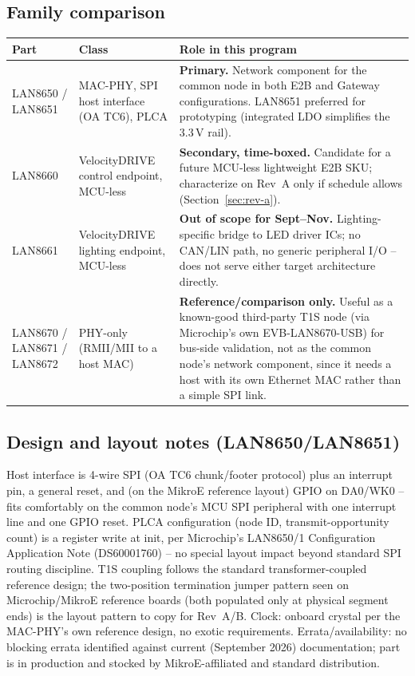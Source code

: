 \subsection{Family comparison}

\begin{center}
\small
\begin{tabularx}{\linewidth}{@{}p{2.4cm} p{2.6cm} X@{}}
\toprule
\textbf{Part} & \textbf{Class} & \textbf{Role in this program} \\
\midrule
LAN8650 / LAN8651 & MAC-PHY, SPI host interface (OA TC6), PLCA & \textbf{Primary.} Network component for the common node in both E2B and Gateway configurations. LAN8651 preferred for prototyping (integrated LDO simplifies the 3.3\,V rail). \\
LAN8660 & VelocityDRIVE control endpoint, MCU-less & \textbf{Secondary, time-boxed.} Candidate for a future MCU-less lightweight E2B SKU; characterize on Rev~A only if schedule allows (Section~\ref{sec:rev-a}). \\
LAN8661 & VelocityDRIVE lighting endpoint, MCU-less & \textbf{Out of scope for Sept--Nov.} Lighting-specific bridge to LED driver ICs; no CAN/LIN path, no generic peripheral I/O -- does not serve either target architecture directly. \\
LAN8670 / LAN8671 / LAN8672 & PHY-only (RMII/MII to a host MAC) & \textbf{Reference/comparison only.} Useful as a known-good third-party T1S node (via Microchip's own EVB-LAN8670-USB) for bus-side validation, not as the common node's network component, since it needs a host with its own Ethernet MAC rather than a simple SPI link. \\
\bottomrule
\end{tabularx}
\end{center}

\subsection{Design and layout notes (LAN8650/LAN8651)}

Host interface is 4-wire SPI (OA TC6 chunk/footer protocol) plus an interrupt pin, a general reset, and (on the MikroE reference layout) GPIO on DA0/WK0 -- fits comfortably on the common node's MCU SPI peripheral with one interrupt line and one GPIO reset. PLCA configuration (node ID, transmit-opportunity count) is a register write at init, per Microchip's LAN8650/1 Configuration Application Note (DS60001760) -- no special layout impact beyond standard SPI routing discipline. T1S coupling follows the standard transformer-coupled reference design; the two-position termination jumper pattern seen on Microchip/MikroE reference boards (both populated only at physical segment ends) is the layout pattern to copy for Rev~A/B. Clock: onboard crystal per the MAC-PHY's own reference design, no exotic requirements. Errata/availability: no blocking errata identified against current (September 2026) documentation; part is in production and stocked by MikroE-affiliated and standard distribution.

